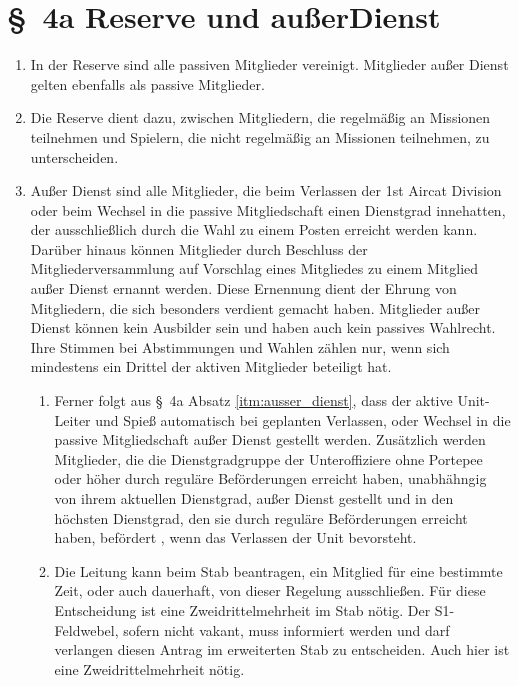 \newpage
\section*{\S~4a Reserve und au\ss{er}Dienst} 
\label{sec:reserve_und_außer_dienst}

\begin{enumerate}[label=(\arabic*)]
    \item In der Reserve sind alle passiven Mitglieder vereinigt. Mitglieder außer Dienst gelten ebenfalls als passive Mitglieder.    
    \item Die Reserve dient dazu, zwischen Mitgliedern, die regelmäßig an Missionen teilnehmen und Spielern, die nicht regelmäßig an Missionen teilnehmen, zu unterscheiden.    
    \item \label{itm:ausser_dienst}Außer Dienst sind alle Mitglieder, die beim Verlassen der 1st Aircat Division oder beim Wechsel in die passive Mitgliedschaft einen Dienstgrad innehatten, der ausschließlich durch die Wahl zu einem Posten erreicht werden kann. Darüber hinaus können Mitglieder durch Beschluss der Mitgliederversammlung auf Vorschlag eines Mitgliedes zu einem Mitglied außer Dienst ernannt werden. Diese Ernennung dient der Ehrung von Mitgliedern, die sich besonders verdient gemacht haben. Mitglieder außer Dienst können kein Ausbilder sein und haben auch kein passives Wahlrecht. Ihre Stimmen bei Abstimmungen und Wahlen zählen nur, wenn sich mindestens ein Drittel der aktiven Mitglieder beteiligt hat.  
    \begin{enumerate}[label=(\Alph*)] 
		\item Ferner folgt aus \S~4a Absatz \ref{itm:ausser_dienst}, dass der aktive Unit-Leiter und Spie\ss{} automatisch bei geplanten Verlassen, oder Wechsel in die passive Mitgliedschaft au\ss{er} Dienst gestellt werden. Zus\"{a}tzlich werden Mitglieder, die die Dienstgradgruppe der Unteroffiziere ohne Portepee oder h\"{o}her durch regul\"{a}re Bef\"{o}rderungen erreicht haben, unabh\"{a}hngig von ihrem aktuellen Dienstgrad, au\ss{er} Dienst gestellt und in den h\"{o}chsten Dienstgrad, den sie durch regul\"{a}re Bef\"{o}rderungen erreicht haben, bef\"{o}rdert , wenn das Verlassen der Unit bevorsteht.
		\item Die Leitung kann beim Stab beantragen, ein Mitglied f\"{u}r eine bestimmte Zeit, oder auch dauerhaft, von dieser Regelung ausschließen. F\"{u}r diese Entscheidung ist eine Zweidrittelmehrheit im Stab n\"{o}tig. Der S1-Feldwebel, sofern nicht vakant, muss informiert werden und darf verlangen diesen Antrag im erweiterten Stab zu entscheiden. Auch hier ist eine Zweidrittelmehrheit n\"{o}tig.

\end{enumerate}
\end{enumerate}
